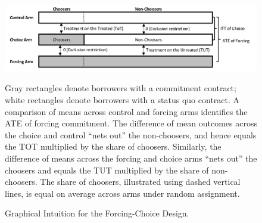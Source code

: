 \documentclass[12pt, a4paper]{article}
\begin{document}
\begin{figure}
\caption{Graphical Intuition for the Forcing-Choice Design.} 
    \begin{center}
        \centering
        \includegraphics[width=1.0\textwidth]{Figuras/tot_tut_intuition.png}
    \end{center}
 \scriptsize{
    Gray rectangles denote borrowers with a commitment contract; white rectangles denote borrowers with a status quo contract. 
    A comparison of means across control and forcing arms identifies the ATE of forcing commitment. 
    The difference of mean outcomes across the choice and control ``nets out'' the non-choosers, and hence equals the TOT multiplied by the share of choosers.
    Similarly, the difference of means across the forcing and choice arms ``nets out'' the choosers and equals the TUT multiplied by the share of non-choosers.
        The share of choosers, illustrated using dashed vertical lines, is equal on average across arms under random assignment.}
    \label{tot_tut_graph}
\end{figure}   
\end{document}
